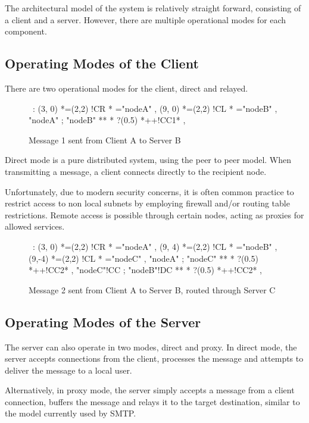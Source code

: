 The architectural model of the system is relatively straight forward,
consisting of a client and a server. However, there are multiple
operational modes for each component.

\subsection{Operating Modes of the Client}

There are two operational modes for the client, direct and relayed.

\begin{figure}[hbt]

\begin{center}
\ \xy<1cm,0cm>:
(3, 0) *=(2,2) !CR  *\frm{-} ="nodeA" , 
(9, 0) *=(2,2) !CL  *\frm{=} ="nodeB" , 
"nodeA" ; "nodeB" **\dir{-} *\dir{>} ?(0.5) *++!CC{1}* , 
\endxy
\end{center}

\caption{Message 1 sent from Client A to Server B}

\end{figure}

Direct mode is a pure distributed system, using the peer to peer model.
When transmitting a message, a client connects directly to the
recipient node.


Unfortunately, due to modern security concerns, it is often common 
practice to restrict access to non local subnets by employing firewall
and/or routing table restrictions. Remote access is possible through
certain nodes, acting as proxies for allowed services. 

\begin{figure}[hbt]

\begin{center}
\ \xy<1cm,0cm>:
(3, 0) *=(2,2) !CR  *\frm{-} ="nodeA" , 
(9, 4) *=(2,2) !CL  *\frm{=} ="nodeB" , 
(9,-4) *=(2,2) !CL  *\frm{=} ="nodeC" , 
"nodeA" ; "nodeC" **\dir{-} *\dir{>} ?(0.5) *++!CC{2}* , 
"nodeC"!CC ; "nodeB"!DC **\dir{-} *\dir{>} ?(0.5) *++!CC{2}* , 
\endxy
\end{center}

\caption{Message 2 sent from Client A to Server B, routed through Server C}

\end{figure}

\subsection{Operating Modes of the Server}

The server can also operate in two modes, direct and proxy. In direct
mode, the server accepts connections from the client, processes the
message and attempts to deliver the message to a local user.


Alternatively, in proxy mode, the server simply accepts a message from a
client connection, buffers the message and relays it to the target 
destination, similar to the model currently used by SMTP.
